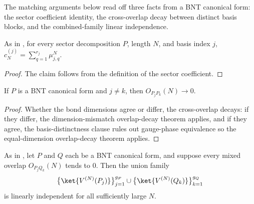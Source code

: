 The matching arguments below read off three facts from a BNT canonical form: the
sector coefficient identity, the cross-overlap decay between distinct basis blocks,
and the combined-family linear independence.

\begin{lemma}%
    \label{lem:sector_bnt_coeff_eq_sum_weight_pow}
    \leanok
    As in \cite[Section~2.3]{Cirac2016MPDO_arXiv}, for every sector
    decomposition $P$, length $N$, and basis index $j$,
    $c_N^{(j)} = \sum_{q=1}^{r_j} \mu_{j,q}^N$.
\end{lemma}

\begin{proof}\leanok
    The claim follows from the definition of the sector coefficient.
\end{proof}

\begin{lemma}%
    \label{lem:sector_bnt_cross_overlap_basis_tendsto_zero}
    \leanok
    If $P$ is a BNT canonical form and $j \neq k$, then
    $O_{P_j P_k}(N) \to 0$.
\end{lemma}

\begin{proof}\leanok
    Whether the bond dimensions agree or differ, the cross-overlap decays: if
    they differ, the dimension-mismatch overlap-decay theorem applies, and if
    they agree, the basis-distinctness clause rules out gauge-phase
    equivalence so the equal-dimension overlap-decay theorem applies.
\end{proof}

\begin{lemma}%
    \label{lem:sector_bnt_combined_family_eventually_li}
    \leanok
    As in \cite[Appendix~A]{Cirac2016MPDO_arXiv}, let $P$ and $Q$ each be a
    BNT canonical form, and suppose every mixed overlap $O_{P_j Q_k}(N)$ tends
    to $0$. Then the union family
    \begin{align}
        \bigl\{\ket{V^{(N)}(P_j)}\bigr\}_{j=1}^{g_P}
        \cup
        \bigl\{\ket{V^{(N)}(Q_k)}\bigr\}_{k=1}^{g_Q}
        \notag
    \end{align}
    is linearly independent for all sufficiently large $N$.
\end{lemma}

